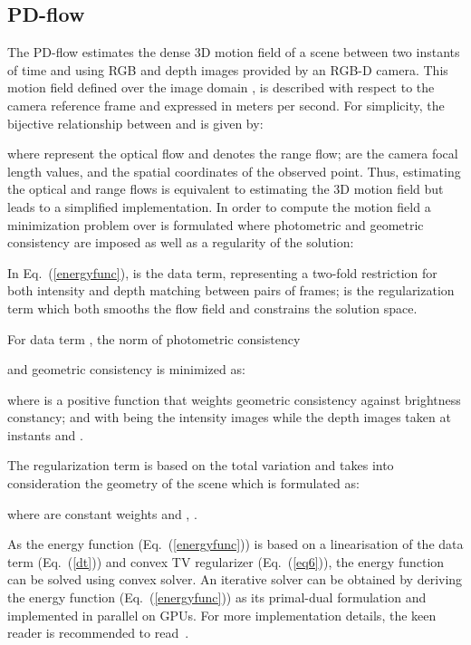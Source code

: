 \documentclass[10pt,twocolumn,letterpaper]{article}
\begin{document}
\subsection{PD-flow}\label{pdflow}

The PD-flow estimates the dense 3D motion field of a scene between 
two instants of time  and  using RGB and depth images provided by an 
RGB-D camera. This motion field   defined over the image domain , is 
described with respect to the camera reference frame and expressed in meters per 
second. For simplicity, the bijective relationship  between  and   is given by:

where  represent the optical flow and  denotes the range 
flow;  are the camera focal length values, and  the 
spatial coordinates of the observed point. Thus, estimating the optical and 
range flows is equivalent to estimating the 3D motion field but leads to a 
simplified implementation. In order to compute the motion field a minimization 
problem over  is formulated where photometric and geometric 
consistency are imposed as well as a regularity of the solution:

In Eq.~(\ref{energyfunc}),  is the data term, representing a 
two-fold restriction for both intensity and depth matching between pairs of 
frames;  is the regularization term which both smooths the 
flow field and constrains the solution space. 


For data term , the  norm of photometric consistency 
 
and geometric consistency  is minimized as:

where  is a positive function that weights geometric consistency against brightness constancy;  and  with  being the intensity images while  the depth images taken at instants  and .

The regularization term  is based on the total 
variation and takes into consideration the geometry of the scene which is 
formulated as:


where  are constant weights and , . 

As the energy function (Eq.~(\ref{energyfunc})) is based on a linearisation of the 
data term (Eq.~(\ref{dt})) and convex TV regularizer (Eq.~(\ref{eq6})), the energy function 
can be solved using convex solver. An iterative solver can be obtained by 
deriving the energy function (Eq.~(\ref{energyfunc})) as its primal-dual formulation 
and implemented in parallel on GPUs. For more implementation details, the keen 
reader is recommended to read~\cite{jaimezprimal}.
\end{document}
